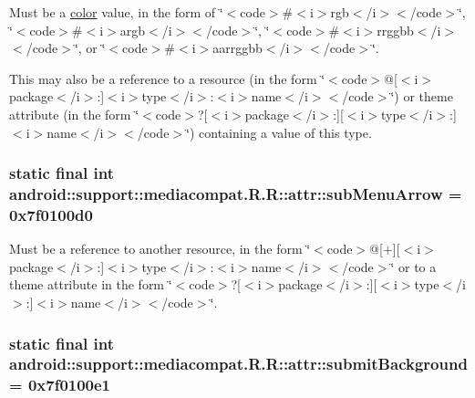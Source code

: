 Must be a \hyperlink{classandroid_1_1support_1_1mediacompat_1_1_r_1_1color}{color} value, in the form of \char`\"{}$<$code$>$\#$<$i$>$rgb$<$/i$>$$<$/code$>$\char`\"{}, \char`\"{}$<$code$>$\#$<$i$>$argb$<$/i$>$$<$/code$>$\char`\"{}, \char`\"{}$<$code$>$\#$<$i$>$rrggbb$<$/i$>$$<$/code$>$\char`\"{}, or \char`\"{}$<$code$>$\#$<$i$>$aarrggbb$<$/i$>$$<$/code$>$\char`\"{}. 

This may also be a reference to a resource (in the form \char`\"{}$<$code$>$@\mbox{[}$<$i$>$package$<$/i$>$:\mbox{]}$<$i$>$type$<$/i$>$:$<$i$>$name$<$/i$>$$<$/code$>$\char`\"{}) or theme attribute (in the form \char`\"{}$<$code$>$?\mbox{[}$<$i$>$package$<$/i$>$:\mbox{]}\mbox{[}$<$i$>$type$<$/i$>$:\mbox{]}$<$i$>$name$<$/i$>$$<$/code$>$\char`\"{}) containing a value of this type. \hypertarget{classandroid_1_1support_1_1mediacompat_1_1_r_1_1attr_a6bd9ac6c609915ee4e7b977a785ebc7}{
\subsubsection[{subMenuArrow}]{\setlength{\rightskip}{0pt plus 5cm}static final int android::support::mediacompat.R.R::attr::subMenuArrow = 0x7f0100d0}}
\label{classandroid_1_1support_1_1mediacompat_1_1_r_1_1attr_a6bd9ac6c609915ee4e7b977a785ebc7}


Must be a reference to another resource, in the form \char`\"{}$<$code$>$@\mbox{[}+\mbox{]}\mbox{[}$<$i$>$package$<$/i$>$:\mbox{]}$<$i$>$type$<$/i$>$:$<$i$>$name$<$/i$>$$<$/code$>$\char`\"{} or to a theme attribute in the form \char`\"{}$<$code$>$?\mbox{[}$<$i$>$package$<$/i$>$:\mbox{]}\mbox{[}$<$i$>$type$<$/i$>$:\mbox{]}$<$i$>$name$<$/i$>$$<$/code$>$\char`\"{}. \hypertarget{classandroid_1_1support_1_1mediacompat_1_1_r_1_1attr_b3f0c9e73f890373064364b5b7d33c14}{
\subsubsection[{submitBackground}]{\setlength{\rightskip}{0pt plus 5cm}static final int android::support::mediacompat.R.R::attr::submitBackground = 0x7f0100e1}}
\label{classandroid_1_1support_1_1mediacompat_1_1_r_1_1attr_b3f0c9e73f890373064364b5b7d33c14}


